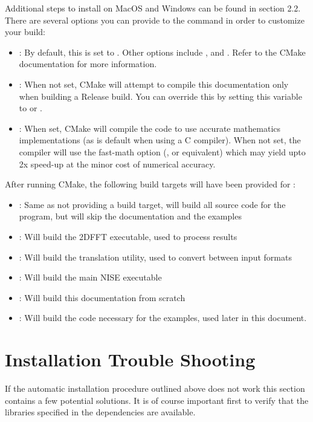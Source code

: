 \noindent
Additional steps to install on MacOS and Windows can be found in section 2.2.\\

There are several options you can provide to the  command in order to
customize your build:
\begin{itemize}
\item {}: By default, this is set to . Other options include ,  and . Refer to the CMake documentation for more information.
\item {}: When not set, CMake will attempt to compile this documentation only when building a Release build. You can override this by setting this variable to  or .
\item {}: When set, CMake will compile the code to use accurate mathematics implementations (as is default when using a C compiler). When not set, the compiler will use the fast-math option (,  or equivalent) which may yield upto 2x speed-up at the minor cost of numerical accuracy.
\end{itemize}

After running CMake, the following build targets will have been provided for :
\begin{itemize}
\item {}: Same as not providing a build target, will build all source code for the program, but will skip the documentation and the examples
\item {}: Will build the 2DFFT executable, used to process results
\item {}: Will build the translation utility, used to convert between input formats
\item {}: Will build the main NISE executable
\item {}: Will build this documentation from scratch
\item {}: Will build the code necessary for the examples, used later in this document.
\end{itemize}

\section{Installation Trouble Shooting}
If the automatic installation procedure outlined above does not work this section
contains a few potential solutions. It is of course important first to verify that the
libraries specified in the dependencies are available.

